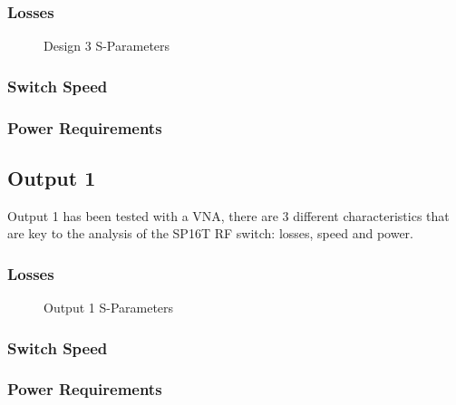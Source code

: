 \documentclass[12pt,openany,a4paper]{book}
\begin{document}
\subsubsection{Losses}
\begin{figure}[H]
	\centering
	\caption{Design 3 S-Parameters}
	\label{fig:design3_sma}
\end{figure} 




\subsubsection{Switch Speed}

\subsubsection{Power Requirements}


\subsection{Output 1}
Output 1 has been tested with a VNA, there are $3$ different characteristics that are key to the analysis of the SP16T RF switch: losses, speed and power.

\subsubsection{Losses}
\begin{figure}[H]
	\centering
	\caption{Output 1 S-Parameters}
	\label{fig:output1_sp}
\end{figure} 




\subsubsection{Switch Speed}

\subsubsection{Power Requirements}
\end{document}
